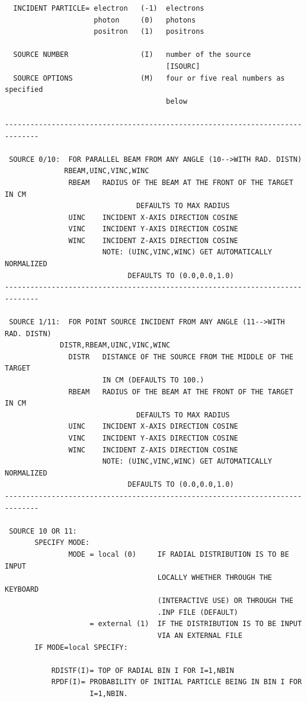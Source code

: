 \documentclass[12pt,twoside]{article}  %
\begin{document}
\begin{verbatim}
  INCIDENT PARTICLE= electron   (-1)  electrons
                     photon     (0)   photons
                     positron   (1)   positrons

  SOURCE NUMBER                 (I)   number of the source
                                      [ISOURC]
  SOURCE OPTIONS                (M)   four or five real numbers as specified
                                      below

------------------------------------------------------------------------------

 SOURCE 0/10:  FOR PARALLEL BEAM FROM ANY ANGLE (10-->WITH RAD. DISTN)
              RBEAM,UINC,VINC,WINC
               RBEAM   RADIUS OF THE BEAM AT THE FRONT OF THE TARGET IN CM
                               DEFAULTS TO MAX RADIUS
               UINC    INCIDENT X-AXIS DIRECTION COSINE
               VINC    INCIDENT Y-AXIS DIRECTION COSINE
               WINC    INCIDENT Z-AXIS DIRECTION COSINE
                       NOTE: (UINC,VINC,WINC) GET AUTOMATICALLY NORMALIZED
                             DEFAULTS TO (0.0,0.0,1.0)
------------------------------------------------------------------------------

 SOURCE 1/11:  FOR POINT SOURCE INCIDENT FROM ANY ANGLE (11-->WITH RAD. DISTN)
             DISTR,RBEAM,UINC,VINC,WINC
               DISTR   DISTANCE OF THE SOURCE FROM THE MIDDLE OF THE TARGET
                       IN CM (DEFAULTS TO 100.)
               RBEAM   RADIUS OF THE BEAM AT THE FRONT OF THE TARGET IN CM
                               DEFAULTS TO MAX RADIUS
               UINC    INCIDENT X-AXIS DIRECTION COSINE
               VINC    INCIDENT Y-AXIS DIRECTION COSINE
               WINC    INCIDENT Z-AXIS DIRECTION COSINE
                       NOTE: (UINC,VINC,WINC) GET AUTOMATICALLY NORMALIZED
                             DEFAULTS TO (0.0,0.0,1.0)
------------------------------------------------------------------------------

 SOURCE 10 OR 11:
       SPECIFY MODE:
               MODE = local (0)     IF RADIAL DISTRIBUTION IS TO BE INPUT
                                    LOCALLY WHETHER THROUGH THE KEYBOARD
                                    (INTERACTIVE USE) OR THROUGH THE
                                    .INP FILE (DEFAULT)
                    = external (1)  IF THE DISTRIBUTION IS TO BE INPUT
                                    VIA AN EXTERNAL FILE
       IF MODE=local SPECIFY:

           RDISTF(I)= TOP OF RADIAL BIN I FOR I=1,NBIN
           RPDF(I)= PROBABILITY OF INITIAL PARTICLE BEING IN BIN I FOR
                    I=1,NBIN.


\end{verbatim}
\end{document}
